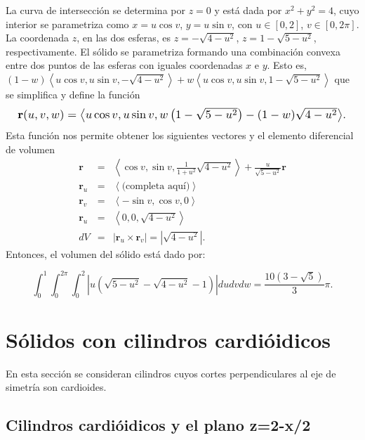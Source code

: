 La curva de intersección se determina por $z=0$ y está dada por $x^{2}+y^{2}=4$, cuyo interior se parametriza como
$x=u\cos v$, $y=u\sin v$, con $u\in [0,2]$, $v\in [0,2\pi ]$.
La coordenada $z$, en las dos esferas, es
$z= -\sqrt{4-u^{2}}$, $z= 1-\sqrt{5-u^{2}}$, respectivamente.
El sólido se parametriza formando una combinación convexa entre dos puntos de las esferas con iguales coordenadas $x$ e $y$. Esto es,
$(1-w) \left\langle u\cos v,u\sin v,-\sqrt{4-u^{2}}\right\rangle +w\left\langle u\cos v,u\sin v,1-\sqrt{5-u^{2}}\right\rangle$
que se simplifica y define la función
{\small
\[
\resizebox{\linewidth}{!}{
$\mathbf{r}(u,v,w)=\left\langle u\cos v,u\sin v,w\left(1-\sqrt{5-u^{2}}\right)-(1-w)\sqrt{4-u^{2}}\right\rangle$.
}
\]
}
Esta función nos permite obtener los siguientes vectores y el elemento diferencial de volumen
{\small
\begin{eqnarray*}
\mathbf{r} &=& \left\langle \cos v, \sin v, \frac{1}{1+u^2} \sqrt{4-u^2} \right\rangle + \frac{u}{\sqrt{5-u^2}} \mathbf{r} \\
\mathbf{r}_u &=& \left\langle \text{(completa aquí)} \right\rangle \\
\mathbf{r}_v &=& \left\langle -\sin v, \cos v, 0 \right\rangle \\
\mathbf{r}_u &=& \left\langle 0, 0, \sqrt{4-u^2} \right\rangle \\
dV &=& \left| \mathbf{r}_u \times \mathbf{r}_v \right| = \left| \sqrt{4-u^2} \right|.
\end{eqnarray*}
}
Entonces, el volumen del sólido está dado por:

\[\int_{0}^{1}\int_{0}^{2\pi }\int_{0}^{2}\left\vert u\left( \sqrt{5-u^{2}}-
\sqrt{4-u^{2}}-1\right)\right\vert dudvdw=\frac{10(3-\sqrt{5})}{3}\pi.\]

\section{Sólidos con cilindros cardióidicos} 

En esta sección se consideran cilindros cuyos cortes perpendiculares al eje de simetría son cardioides.

\subsection{Cilindros cardióidicos y el plano z=2-x/2}

